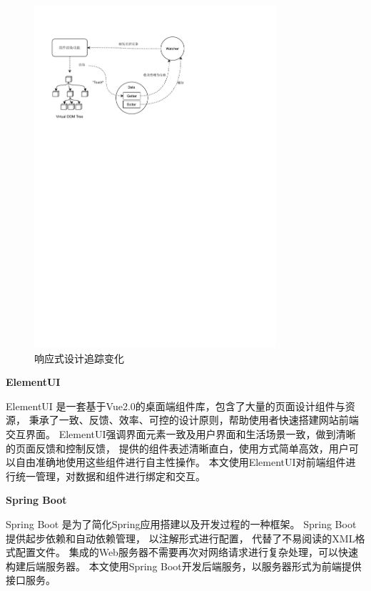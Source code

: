 \begin{figure}[h] %
    \centering %
    \includegraphics[width=0.8\textwidth]{FIGs/chapter2/vue.pdf} %
    \caption{响应式设计追踪变化} %
    \label{vue} %
\end{figure}%

\textbf{ElementUI}

ElementUI\footnotemark[7]
是一套基于Vue2.0的桌面端组件库，包含了大量的页面设计组件与资源，
秉承了一致、反馈、效率、可控的设计原则，帮助使用者快速搭建网站前端交互界面。
ElementUI强调界面元素一致及用户界面和生活场景一致，做到清晰的页面反馈和控制反馈，
提供的组件表述清晰直白，使用方式简单高效，用户可以自由准确地使用这些组件进行自主性操作。
本文使用ElementUI对前端组件进行统一管理，对数据和组件进行绑定和交互。

\textbf{Spring Boot}

Spring Boot\footnotemark[8]
是为了简化Spring应用搭建以及开发过程的一种框架。
Spring Boot提供起步依赖和自动依赖管理，
以注解形式进行配置，
代替了不易阅读的XML格式配置文件。
集成的Web服务器不需要再次对网络请求进行复杂处理，可以快速构建后端服务器。
本文使用Spring Boot开发后端服务，以服务器形式为前端提供接口服务。

